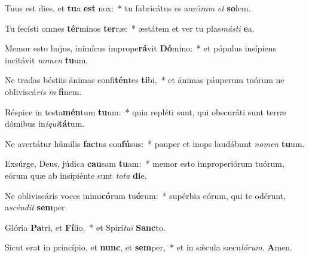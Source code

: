\item Tuus est dies, et \textbf{tu}a \textbf{est} nox:~* tu fabricátus es auró\textit{ram} \textit{et} \textbf{so}lem.
\item Tu fecísti omnes \textbf{tér}minos \textbf{ter}ræ:~* æstátem et ver tu plas\textit{más}\textit{ti} \textbf{e}a.
\item Memor esto hujus, inimícus imprope\textbf{rá}vit \textbf{Dó}mino:~* et pópulus insípiens incitávit \textit{no}\textit{men} \textbf{tu}um.
\item Ne tradas béstiis ánimas confi\textbf{tén}tes \textbf{ti}bi,~* et ánimas páuperum tuórum ne obliviscá\textit{ris} \textit{in} \textbf{fi}nem.
\item Réspice in testa\textbf{mén}tum \textbf{tu}um:~* quia repléti sunt, qui obscuráti sunt terræ dómibus in\textit{i}\textit{qui}\textbf{tá}tum.
\item Ne avertátur húmilis \textbf{fac}tus con\textbf{fú}sus:~* pauper et inops laudábunt \textit{no}\textit{men} \textbf{tu}um.
\item Exsúrge, Deus, júdica \textbf{cau}sam \textbf{tu}am:~* memor esto improperiórum tuórum, eórum quæ ab insipiénte sunt \textit{to}\textit{ta} \textbf{di}e.
\item Ne obliviscáris voces inimi\textbf{có}rum tu\textbf{ó}rum:~* supérbia eórum, qui te odérunt, a\textit{scén}\textit{dit} \textbf{sem}per.
\item Glória \textbf{Pa}tri, et \textbf{Fí}lio,~* et Spirí\textit{tu}\textit{i} \textbf{Sanc}to.
\item Sicut erat in princípio, et \textbf{nunc}, et \textbf{sem}per,~* et in sǽcula sæcu\textit{ló}\textit{rum}. \textbf{A}men.
